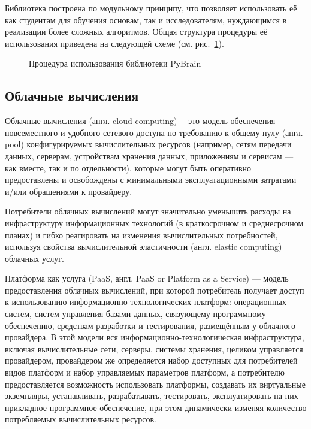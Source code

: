 Библиотека построена по модульному принципу, что позволяет использовать её как студентам для обучения основам, так и исследователям, нуждающимся в реализации более сложных алгоритмов. 
Общая структура процедуры её использования приведена на следующей схеме (см. рис.~\ref{pic:pybrain}).\cite{schaul2010}
\begin{figure}[ht]
\caption[Процедура использования библиотеки PyBrain]{Процедура использования библиотеки PyBrain}
\label{pic:pybrain}
\end{figure}

\subsection{Облачные вычисления}

Облачные вычисления (англ. cloud computing)--- это модель обеспечения повсеместного и удобного сетевого доступа по требованию к общему пулу (англ. pool) конфигурируемых вычислительных ресурсов (например, сетям передачи данных, серверам, устройствам хранения данных, приложениям и сервисам — как вместе, так и по отдельности), которые могут быть оперативно предоставлены и освобождены с минимальными эксплуатационными затратами и/или обращениями к провайдеру. 

Потребители облачных вычислений могут значительно уменьшить расходы на инфраструктуру информационных технологий (в краткосрочном и среднесрочном планах) и гибко реагировать на изменения вычислительных потребностей, используя свойства вычислительной эластичности (англ. elastic computing) облачных услуг.

Платформа как услуга  (PaaS, англ. PaaS or Platform as a Service) --- модель предоставления облачных вычислений, при которой потребитель получает доступ к использованию информационно-технологических платформ: операционных систем, систем управления базами данных, связующему программному обеспечению, средствам разработки и тестирования, размещённым у облачного провайдера. 
В этой модели вся информационно-технологическая инфраструктура, включая вычислительные сети, серверы, системы хранения, целиком управляется провайдером, провайдером же определяется набор доступных для потребителей видов платформ и набор управляемых параметров платформ, а потребителю предоставляется возможность использовать платформы, создавать их виртуальные экземпляры, устанавливать, разрабатывать, тестировать, эксплуатировать на них прикладное программное обеспечение, при этом динамически изменяя количество потребляемых вычислительных ресурсов.

